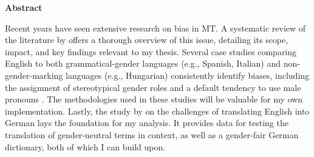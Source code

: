 \thispagestyle{empty}

\vspace*{1cm}

\begin{center}
    \textbf{Abstract}
\end{center}

\vspace*{1cm}

\noindent 
Recent years have seen extensive research on bias in MT. A systematic review of the literature by \citeauthor{shresthaExploringGenderBiases2022} offers a thorough overview of this issue, detailing its scope, impact, and key findings relevant to my thesis. Several case studies comparing English to both grammatical-gender languages (e.g., Spanish, Italian) and non-gender-marking languages (e.g., Hungarian) consistently identify biases, including the assignment of stereotypical gender roles and a default tendency to use male pronouns \cite{stanovskyEvaluatingGenderBias2019,pratesAssessingGenderBias2019,smacchiaDoesAIReflect2024}. The methodologies used in these studies will be valuable for my own implementation. Lastly, the study by \citeauthor{lardelliBuildingBridgesDataset2024} on the challenges of translating English into German lays the foundation for my analysis. It provides data for testing the translation of gender-neutral terms in context, as well as a gender-fair German dictionary, both of which I can build upon.

